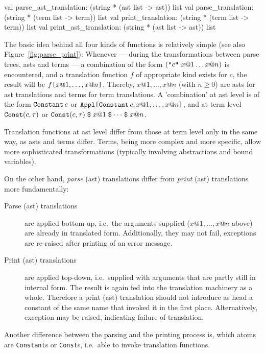 \begin{ttbox}
val parse_ast_translation: (string * (ast list -> ast)) list
val parse_translation: (string * (term list -> term)) list
val print_translation: (string * (term list -> term)) list
val print_ast_translation: (string * (ast list -> ast)) list
\end{ttbox}

The basic idea behind all four kinds of functions is relatively simple (see
also Figure~\ref{fig:parse_print}): Whenever --- during the transformations
between parse trees, asts and terms --- a combination of the form
$(\mbox{\tt "}c\mbox{\tt "}~x@1 \ldots x@n)$ is encountered, and a translation function $f$
of appropriate kind exists for $c$, the result will be $f \mbox{\tt [} x@1, \ldots,
x@n \mbox{\tt ]}$. Thereby, $x@1, \ldots, x@n$ (with $n \ge 0$) are asts for ast
translations and terms for term translations. A 'combination' at ast level is
of the form $\mathop{\mbox{\tt Constant}}\nolimits c$ or $\mathop{\mbox{\tt Appl}}\nolimits\mathopen{\mbox{\tt [}}\mathop{\mbox{\tt Constant}}\nolimits c, x@1, \ldots, x@n\mathclose{\mbox{\tt ]}}$, and at
term level $\mathop{\mbox{\tt Const}}\nolimits (c, \tau)$ or $\ttfct{Const} (c, \tau) \ttrel{\$}
x@1 \ttrel{\$} \dots \ttrel{\$} x@n$.

\medskip
Translation functions at ast level differ from those at term level only in
the same way, as asts and terms differ. Terms, being more complex and more
specific, allow more sophisticated transformations (typically involving
abstractions and bound variables).

On the other hand, {\em parse} (ast) translations differ from {\em print}
(ast) translations more fundamentally:
\begin{description}
  \item[Parse (ast) translations] are applied bottom-up, i.e.\ the arguments
    supplied ($x@1, \ldots, x@n$ above) are already in translated form.
    Additionally, they may not fail, exceptions are re-raised after printing
    of an error message.

  \item[Print (ast) translations] are applied top-down, i.e.\ supplied with
    arguments that are partly still in internal form. The result is again fed
    into the translation machinery as a whole. Therefore a print (ast)
    translation should not introduce as head a constant of the same name that
    invoked it in the first place. Alternatively, exception 
    may be raised, indicating failure of translation.
\end{description}

Another difference between the parsing and the printing process is, which
atoms are {\tt Constant}s or {\tt Const}s, i.e.\ able to invoke translation
functions.

